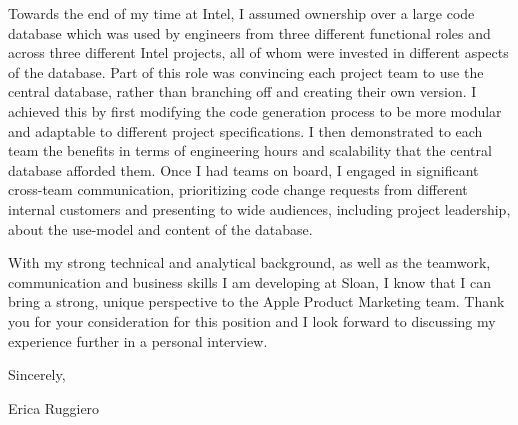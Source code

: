 \documentclass[a4paper,11pt,letter]{business}
\begin{document}
Towards the end of my time at Intel, I assumed ownership over a large code database which was used by engineers from three different functional roles and across three different Intel projects, all of whom were invested in different aspects of the database.
Part of this role was convincing each project team to use the central database, rather than branching off and creating their own version.
I achieved this by first modifying the code generation process to be more modular and adaptable to different project specifications.
I then demonstrated to each team the benefits in terms of engineering hours and scalability that the central database afforded them.
Once I had teams on board, I engaged in significant cross-team communication, prioritizing code change requests from different internal customers and presenting to wide audiences, including project leadership, about the use-model and content of the database.


With my strong technical and analytical background, as well as the teamwork, communication and business skills I am developing at Sloan, I know that I can bring a strong, unique perspective to the Apple Product Marketing team.
Thank you for your consideration for this position and I look forward to discussing my experience further in a personal interview.


Sincerely,


Erica Ruggiero
\end{document}
